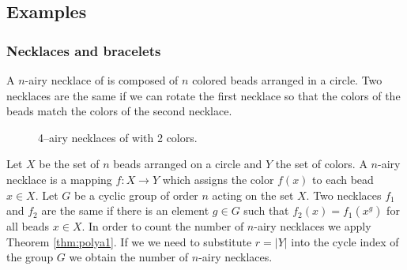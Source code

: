 \documentclass[10pt]{article}
\begin{document}
\subsection{Examples}

\subsubsection{Necklaces and bracelets}

A $n$-airy necklace of is composed of $n$ colored beads arranged in a
circle. Two necklaces are the same if we can rotate the first necklace
so that the colors of the beads match the colors of the second
necklace.

\begin{figure}
\begin{center}
\end{center}
\caption{4--airy necklaces of with 2 colors.}
\label{fig:necklaces2}
\end{figure}

Let $X$ be the set of $n$ beads arranged on a circle and $Y$ the set
of colors. A $n$-airy necklace is a mapping $f:X\to Y$ which assigns
the color $f(x)$ to each bead $x\in X$. Let $G$ be a cyclic group of
order $n$ acting on the set $X$. Two necklaces $f_1$ and $f_2$ are the
same if there is an element $g\in G$ such that $f_2(x)=f_1(x^g)$ for
all beads $x\in X$. In order to count the number of $n$-airy necklaces
we apply Theorem \ref{thm:polya1}. If we we need to substitute $r=|Y|$
into the cycle index of the group $G$ we obtain the number of $n$-airy
necklaces.
\end{document}
